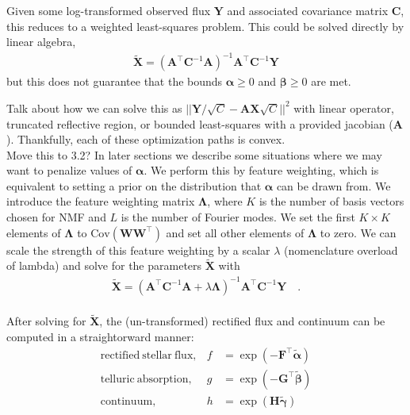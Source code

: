 \documentclass[modern]{aastex631}
\renewcommand{\vec}[1]{\mathbf{#1}}
\newcommand{\vecalpha}{\boldsymbol{\alpha}}
\newcommand{\vecbeta}{\boldsymbol{\beta}}
\newcommand{\transpose}{^\top}
\newcommand{\todo}[1]{\textcolor{tab:red}{#1}}
\begin{document}
Given some log-transformed observed flux $\vec{Y}$ and associated covariance matrix $\vec{C}$, this reduces to a weighted least-squares problem. This could be solved directly by linear algebra,
\begin{eqnarray}
    \vec{\tilde{X}} = (\vec{A}\transpose\vec{C}^{-1}\vec{A})^{-1}\vec{A}\transpose\vec{C}^{-1}\vec{Y}
\end{eqnarray}
\noindent{}but this does not guarantee that the bounds $\vecalpha \geq 0$ and $\vecbeta \geq 0$ are met. 

\todo{Talk about how we can solve this as} $||\vec{Y}/\sqrt{C} - \vec{AX}\sqrt{C}||^2$ with linear operator, truncated reflective region, or bounded least-squares with a provided jacobian ($\vec{A}$).  Thankfully, each of these optimization paths is convex.\\

\todo{Move this to 3.2?}
In later sections we describe some situations where we may want to penalize values of $\vecalpha$. We perform this by feature weighting, which is equivalent to setting a prior on the distribution that $\vecalpha$ can be drawn from. We introduce the feature weighting matrix $\vec{\Lambda}$, where $K$ is the number of basis vectors chosen for NMF and $L$ is the number of Fourier modes. We set the first $K \times K$ elements of $\vec{\Lambda}$ to $\mathrm{Cov}{\left(\vec{W}\vec{W}\transpose\right)}$ and set all other elements of $\vec{\Lambda}$ to zero. We can scale the strength of this feature weighting by a scalar $\lambda$ (\todo{nomenclature overload of lambda}) and solve for the parameters $\vec{\tilde{X}}$ with
\begin{eqnarray}
    \vec{\tilde{X}} = (\vec{A}\transpose\vec{C}^{-1}\vec{A} + \lambda\vec{\Lambda})^{-1}\vec{A}\transpose\vec{C}^{-1}\vec{Y} \quad .
\end{eqnarray}\\

After solving for $\vec{\tilde{X}}$, the (un-transformed) rectified flux and continuum can be computed in a straightorward manner:
\begin{eqnarray}
    \mathrm{rectified~stellar~flux}, &f& = \exp{\left(-\vec{F}\transpose\boldsymbol{\tilde{\alpha}}\right)} \\
    \mathrm{telluric~absorption}, &g& = \exp{\left(-\vec{G}\transpose\boldsymbol{\tilde{\beta}}\right)} \\
    \mathrm{continuum}, &h& = \exp{\left(\vec{H}\boldsymbol{\tilde{\gamma}}\right)}
\end{eqnarray}
\end{document}
